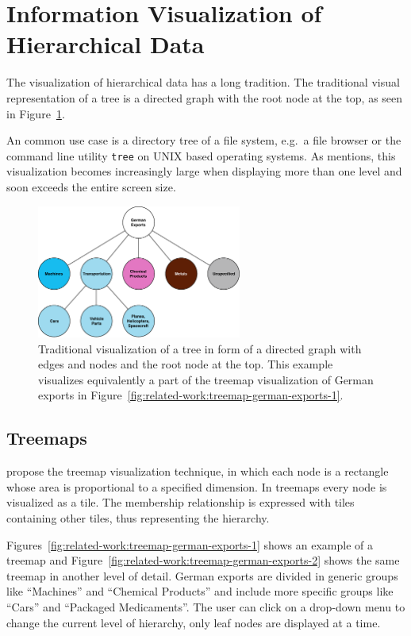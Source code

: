 \section{Information Visualization of Hierarchical Data}
The visualization of hierarchical data has a long tradition.
The traditional visual representation of a tree is a directed graph with the root node at the top, as seen in Figure~\ref{fig:related-work:tree-graph}.

An common use case is a directory tree of a file system, e.g.\ a file browser or the command line utility \texttt{tree} on UNIX based operating systems.
As \textcite{Shneiderman1992} mentions, this visualization becomes increasingly large when displaying more than one level and soon exceeds the entire screen size.

\begin{figure}
  \centering
  \includegraphics[width=0.6\textwidth]{figures/related-work/Treegraph}
  \caption{
    Traditional visualization of a tree in form of a directed graph with edges and nodes and the root node at the top.
    This example visualizes equivalently a part of the treemap visualization of German exports in Figure~\ref{fig:related-work:treemap-german-exports-1}.
  }
  \label{fig:related-work:tree-graph}
\end{figure}

\subsection{Treemaps}
\textcite{Johnson1991} propose the treemap visualization technique, in which each node is a rectangle whose area is proportional to a specified dimension.
In treemaps every node is visualized as a tile.
The membership relationship is expressed with tiles containing other tiles, thus representing the hierarchy.

Figures~\ref{fig:related-work:treemap-german-exports-1} shows an example of a treemap and Figure~\ref{fig:related-work:treemap-german-exports-2} shows the same treemap in another level of detail.
German exports are divided in generic groups like ``Machines'' and ``Chemical Products'' and include more specific groups like ``Cars'' and ``Packaged Medicaments''.
The user can click on a drop-down menu to change the current level of hierarchy, only leaf nodes are displayed at a time.

